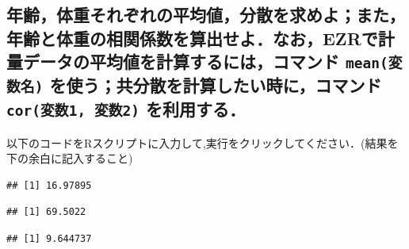 \documentclass[11pt,]{problemset}
\newenvironment{Shaded}{\begin{snugshade}}{\end{snugshade}}
\newcommand{\CommentTok}[1]{\textcolor[rgb]{0.56,0.35,0.01}{\textit{#1}}}
\newcommand{\KeywordTok}[1]{\textcolor[rgb]{0.13,0.29,0.53}{\textbf{#1}}}
\newcommand{\NormalTok}[1]{#1}
\newcommand{\OperatorTok}[1]{\textcolor[rgb]{0.81,0.36,0.00}{\textbf{#1}}}
\begin{document}
\hypertarget{ezr-mean--cor1-2-}{%
\subsection{\texorpdfstring{年齢，体重それぞれの平均値，分散を求めよ；また，年齢と体重の相関係数を算出せよ．なお，EZRで計量データの平均値を計算するには，コマンド
\texttt{mean(変数名)} を使う；共分散を計算したい時に，コマンド
\texttt{cor(変数1,\ 変数2)}
を利用する．}{年齢，体重それぞれの平均値，分散を求めよ；また，年齢と体重の相関係数を算出せよ．なお，EZRで計量データの平均値を計算するには，コマンド mean(変数名) を使う；共分散を計算したい時に，コマンド cor(変数1, 変数2) を利用する．}}\label{ezr-mean--cor1-2-}}

以下のコードをRスクリプトに入力して,実行をクリックしてください．(結果を下の余白に記入すること)

\begin{Shaded}
\end{Shaded}

\begin{verbatim}
## [1] 16.97895
\end{verbatim}

\begin{Shaded}
\end{Shaded}

\begin{verbatim}
## [1] 69.5022
\end{verbatim}

\begin{Shaded}
\end{Shaded}

\begin{verbatim}
## [1] 9.644737
\end{verbatim}

\begin{Shaded}
\end{Shaded}
\end{document}
